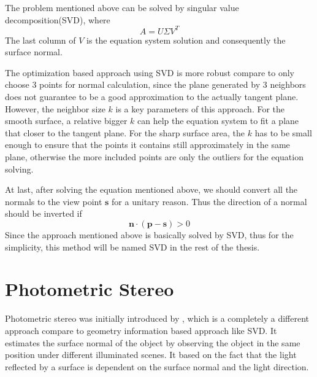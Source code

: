 The problem mentioned above can be solved by singular value decomposition(SVD), where
\[ A=U\Sigma V^T \]
The last column of $ V $ is the equation system solution and consequently the surface normal. 

The optimization based approach using SVD is more robust compare to only choose 3 points for normal calculation, since the plane generated by 3 neighbors does not guarantee to be a good approximation to the actually tangent plane. However, the neighbor size $ k $ is a key parameters of this approach. For the smooth surface, a relative bigger $ k $ can help the equation system to fit a plane that closer to the tangent plane. For the sharp surface area, the $ k $ has to be small enough to ensure that the points it contains still approximately in the same plane, otherwise the more included points are only the outliers for the equation solving. 

At last, after solving the equation mentioned above, we should convert all the normals to the view point $ \textbf{s} $ for a unitary reason. Thus the direction of a normal should be inverted if 
\begin{equation}\label{eq:normal-invertion}
	\textbf{n} \cdot (\textbf{p}  - \textbf{s}) > 0
\end{equation}
Since the approach mentioned above is basically solved by SVD, thus for the simplicity, this method will be named SVD in the rest of the thesis.


\section{Photometric Stereo}
Photometric stereo was initially introduced by \cite{photometric-stereo}, which is a completely a different approach compare to geometry information based approach like SVD. It estimates the surface normal of the object by observing the object in the same position under different illuminated scenes. It based on the fact that the light reflected by a surface is dependent on the surface normal and the light direction.

